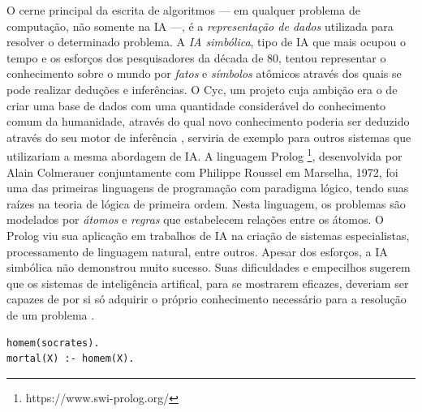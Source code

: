 \documentclass[12pt, a4paper]{article}
\begin{document}
O cerne principal da escrita de algoritmos --- em qualquer problema de computação, não somente na IA ---, 
é a \emph{representação de dados} utilizada para resolver o determinado problema. A \emph{IA simbólica},
tipo de IA que mais ocupou o tempo e os esforços dos pesquisadores da década de 80, tentou representar o conhecimento
sobre o mundo por \emph{fatos} e \emph{símbolos} atômicos através dos quais se pode realizar deduções e inferências. 
O Cyc, um projeto cuja ambição era o de criar uma
base de dados com uma quantidade considerável do conhecimento comum da humanidade, através do qual
novo conhecimento poderia ser deduzido através do seu motor de inferência \cite{cyc}, serviria de exemplo para outros sistemas
que utilizariam a mesma abordagem de IA. A linguagem Prolog \footnote{https://www.swi-prolog.org/}, 
desenvolvida por Alain Colmerauer conjuntamente com Philippe Roussel em Marselha, 1972, 
foi uma das primeiras linguagens de programação com paradigma lógico, tendo suas raízes na teoria de lógica de primeira ordem.
Nesta linguagem, os problemas são modelados por \emph{átomos} e \emph{regras} que estabelecem relações entre os átomos.
O Prolog viu sua aplicação em trabalhos de IA na criação de sistemas especialistas, processamento de linguagem natural, entre outros. 
Apesar dos esforços, a IA simbólica não demonstrou muito sucesso. Suas dificuldades e empecilhos sugerem que os sistemas de inteligência
artifical, para se mostrarem eficazes, deveriam ser capazes de por si só adquirir o próprio conhecimento necessário
para a resolução de um problema \cite{Goodfellow-et-al-2016}.

\bigskip
\begin{lstlisting}[caption={Exemplo do uso da linguagem Prolog para modelar a famosa proposição da mortalidade de Sócrates.}, captionpos=b]
homem(socrates).
mortal(X) :- homem(X).
\end{lstlisting}
\end{document}
